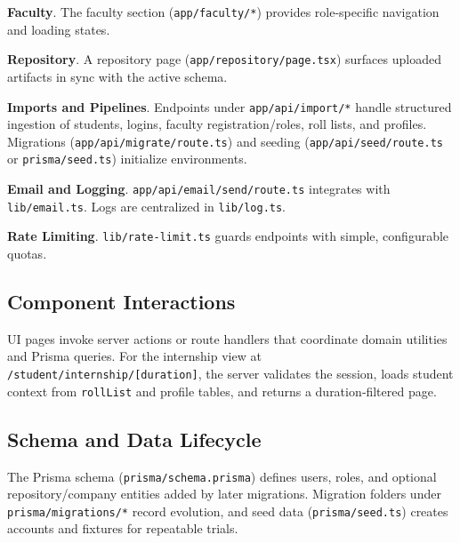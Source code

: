 \documentclass[conference]{IEEEtran}
\begin{document}
\textbf{Faculty}. The faculty section (\texttt{app/faculty/*}) provides role-specific navigation and loading states.

\textbf{Repository}. A repository page (\texttt{app/repository/page.tsx}) surfaces uploaded artifacts in sync with the active schema.

\textbf{Imports and Pipelines}. Endpoints under \texttt{app/api/import/*} handle structured ingestion of students, logins, faculty registration/roles, roll lists, and profiles. Migrations (\texttt{app/api/migrate/route.ts}) and seeding (\texttt{app/api/seed/route.ts} or \texttt{prisma/seed.ts}) initialize environments.

\textbf{Email and Logging}. \texttt{app/api/email/send/route.ts} integrates with \texttt{lib/email.ts}. Logs are centralized in \texttt{lib/log.ts}.

\textbf{Rate Limiting}. \texttt{lib/rate-limit.ts} guards endpoints with simple, configurable quotas.

\subsection{Component Interactions}
UI pages invoke server actions or route handlers that coordinate domain utilities and Prisma queries. For the internship view at \texttt{/student/internship/[duration]}, the server validates the session, loads student context from \texttt{rollList} and profile tables, and returns a duration‑filtered page.

\begin{figure}[t]
  \centering
  \label{fig:seq}
\end{figure}

\subsection{Schema and Data Lifecycle}
The Prisma schema (\texttt{prisma/schema.prisma}) defines users, roles, and optional repository/company entities added by later migrations. Migration folders under \texttt{prisma/migrations/*} record evolution, and seed data (\texttt{prisma/seed.ts}) creates accounts and fixtures for repeatable trials.
\end{document}
